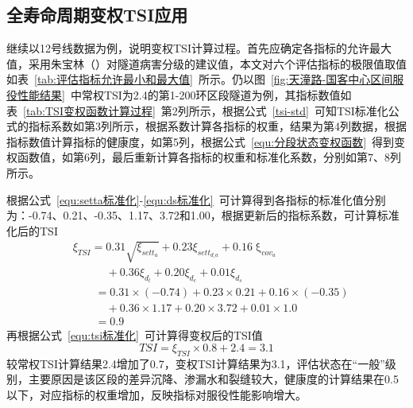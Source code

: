 \subsection{全寿命周期变权TSI应用}

继续以12号线数据为例，说明变权TSI计算过程。首先应确定各指标的允许最大值，采用朱宝林（\citeyear{朱宝林2014运营地铁盾构隧道状态评估及预测方法研究}）对隧道病害分级的建议值，本文对六个评估指标的极限值取值如表~\ref{tab:评估指标允许最小和最大值}~所示。仍以图~\ref{fig:天潼路-国客中心区间服役性能结果}~中常权TSI为2.4的第1-200环区段隧道为例，其指标数值如表~\ref{tab:TSI变权函数计算过程}~第2列所示，根据公式~\ref{tsi-std}~可知TSI标准化公式的指标系数如第3列所示，根据系数计算各指标的权重，结果为第4列数据，根据指标数值计算指标的健康度，如第5列，根据公式~\ref{equ:分段状态变权函数}~得到变权函数值，如第6列，最后重新计算各指标的权重和标准化系数，分别如第7、8列所示。

根据公式~\ref{equ:setta标准化}-\ref{equ:ds标准化}~可计算得到各指标的标准化值分别为：-0.74、0.21、-0.35、1.17、3.72和1.00，根据更新后的指标系数，可计算标准化后的TSI
\begin{align}
  & {\xi }_{TSI}=0.31\sqrt{{\xi }_{sett_a}}+0.23{\xi }_{sett_{d\_a}}+0.16\operatorname{\xi }_{cov_a} \nonumber \\ 
 & \quad \quad \quad +0.36{\xi }_{d_l}+0.20{\xi }_{d_c}+0.01{\xi }_{d_s} \nonumber \\ 
 & \quad \quad =0.31\times (-0.74)+0.23\times 0.21+0.16\times (-0.35) \nonumber \\ 
 & \quad \quad \quad +0.36\times 1.17+0.20\times 3.72+0.01\times 1.0 \nonumber \\ 
 & \quad \quad =0.9 \nonumber
\end{align}
再根据公式~\ref{equ:tsi标准化}~可计算得变权后的TSI值
\begin{equation}
    TSI={\xi }_{TSI}\times 0.8+2.4=3.1 \nonumber
\end{equation}
较常权TSI计算结果2.4增加了0.7，变权TSI计算结果为3.1，评估状态在“一般”级别，主要原因是该区段的差异沉降、渗漏水和裂缝较大，健康度的计算结果在0.5以下，对应指标的权重增加，反映指标对服役性能影响增大。

